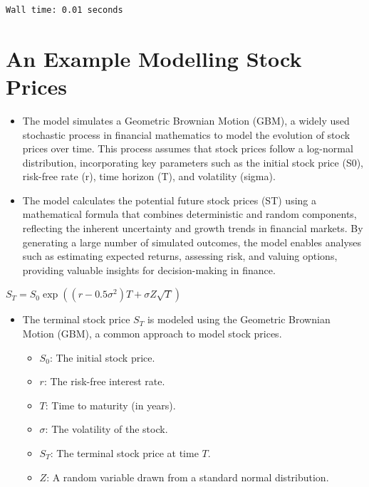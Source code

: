 \documentclass[
  letterpaper,
  DIV=11,
  numbers=noendperiod]{scrreprt}
\providecommand{\tightlist}{%
  \setlength{\itemsep}{0pt}\setlength{\parskip}{0pt}}\usepackage{longtable,booktabs,array}
\begin{document}
\begin{verbatim}
Wall time: 0.01 seconds
\end{verbatim}

\section{An Example Modelling Stock
Prices}\label{an-example-modelling-stock-prices}

\begin{itemize}
\tightlist
\item
  The model simulates a Geometric Brownian Motion (GBM), a widely used
  stochastic process in financial mathematics to model the evolution of
  stock prices over time. This process assumes that stock prices follow
  a log-normal distribution, incorporating key parameters such as the
  initial stock price (S0), risk-free rate (r), time horizon (T), and
  volatility (sigma).
\item
  The model calculates the potential future stock prices (ST) using a
  mathematical formula that combines deterministic and random
  components, reflecting the inherent uncertainty and growth trends in
  financial markets. By generating a large number of simulated outcomes,
  the model enables analyses such as estimating expected returns,
  assessing risk, and valuing options, providing valuable insights for
  decision-making in finance.
\end{itemize}

\(S_T = S_0 \exp\left( (r - 0.5 \sigma^2) T + \sigma Z \sqrt{T} \right)\)

\begin{itemize}
\tightlist
\item
  The terminal stock price \(S_T\) is modeled using the Geometric
  Brownian Motion (GBM), a common approach to model stock prices.

  \begin{itemize}
  \tightlist
  \item
    \(S_0\): The initial stock price.
  \item
    \(r\): The risk-free interest rate.
  \item
    \(T\): Time to maturity (in years).
  \item
    \(\sigma\): The volatility of the stock.
  \item
    \(S_T\): The terminal stock price at time \(T\).
  \item
    \(Z\): A random variable drawn from a standard normal distribution.
  \end{itemize}
\end{itemize}
\end{document}

